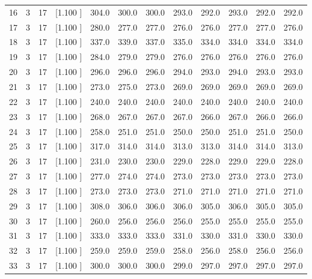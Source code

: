 \documentclass[12pt,a4paper]{article}
\begin{document}
\begin{center}
{\begin{tabular}{r r r r r r r r r r r r}
  16&  3& 17&[1.100     ]&   304.0&   300.0&   300.0&   293.0&   292.0&   293.0&   292.0&   292.0\\[-0.02in]
  17&  3& 17&[1.100     ]&   280.0&   277.0&   277.0&   276.0&   276.0&   277.0&   277.0&   276.0\\[-0.02in]
  18&  3& 17&[1.100     ]&   337.0&   339.0&   337.0&   335.0&   334.0&   334.0&   334.0&   334.0\\[-0.02in]
  19&  3& 17&[1.100     ]&   284.0&   279.0&   279.0&   276.0&   276.0&   276.0&   276.0&   276.0\\[-0.02in]
  20&  3& 17&[1.100     ]&   296.0&   296.0&   296.0&   294.0&   293.0&   294.0&   293.0&   293.0\\[-0.02in]
  21&  3& 17&[1.100     ]&   273.0&   275.0&   273.0&   269.0&   269.0&   269.0&   269.0&   269.0\\[-0.02in]
  22&  3& 17&[1.100     ]&   240.0&   240.0&   240.0&   240.0&   240.0&   240.0&   240.0&   240.0\\[-0.02in]
  23&  3& 17&[1.100     ]&   268.0&   267.0&   267.0&   267.0&   266.0&   267.0&   266.0&   266.0\\[-0.02in]
  24&  3& 17&[1.100     ]&   258.0&   251.0&   251.0&   250.0&   250.0&   251.0&   251.0&   250.0\\[-0.02in]
  25&  3& 17&[1.100     ]&   317.0&   314.0&   314.0&   313.0&   313.0&   314.0&   314.0&   313.0\\[-0.02in]
  26&  3& 17&[1.100     ]&   231.0&   230.0&   230.0&   229.0&   228.0&   229.0&   229.0&   228.0\\[-0.02in]
  27&  3& 17&[1.100     ]&   277.0&   274.0&   274.0&   273.0&   273.0&   273.0&   273.0&   273.0\\[-0.02in]
  28&  3& 17&[1.100     ]&   273.0&   273.0&   273.0&   271.0&   271.0&   271.0&   271.0&   271.0\\[-0.02in]
  29&  3& 17&[1.100     ]&   308.0&   306.0&   306.0&   306.0&   305.0&   306.0&   305.0&   305.0\\[-0.02in]
  30&  3& 17&[1.100     ]&   260.0&   256.0&   256.0&   256.0&   255.0&   255.0&   255.0&   255.0\\[-0.02in]
  31&  3& 17&[1.100     ]&   333.0&   333.0&   333.0&   331.0&   330.0&   331.0&   330.0&   330.0\\[-0.02in]
  32&  3& 17&[1.100     ]&   259.0&   259.0&   259.0&   258.0&   256.0&   258.0&   256.0&   256.0\\[-0.02in]
  33&  3& 17&[1.100     ]&   300.0&   300.0&   300.0&   299.0&   297.0&   297.0&   297.0&   297.0\\[-0.02in]

\end{tabular}}
\end{center}
\end{document}
